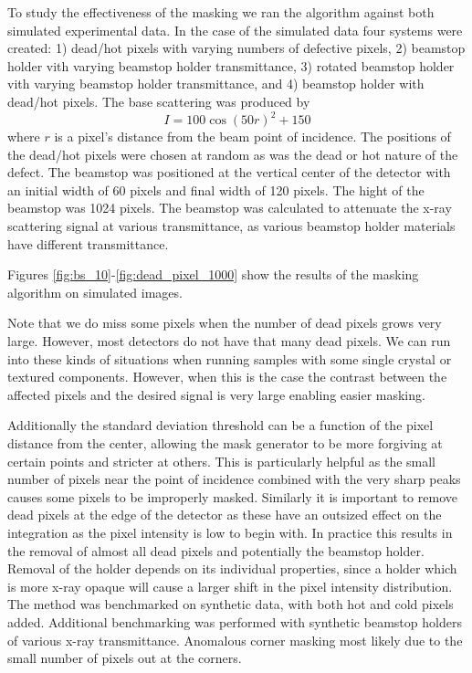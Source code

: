 To study the effectiveness of the masking we ran the algorithm against both simulated experimental data.
In the case of the simulated data four systems were created:
1) dead/hot pixels with varying numbers of defective pixels,
2) beamstop holder vith varying beamstop holder transmittance,
3) rotated beamstop holder vith varying beamstop holder transmittance,
and 4) beamstop holder with dead/hot pixels.
The base scattering was produced by
\begin{equation}
I = 100\cos(50r)^{2} + 150
\end{equation}
where $r$ is a pixel's distance from the beam point of incidence.
The positions of the dead/hot pixels were chosen at random as was the dead or hot nature of the defect.
The beamstop was positioned at the vertical center of the detector with an initial width of 60 pixels and final width of 120 pixels.
The hight of the beamstop was 1024 pixels.
The beamstop was calculated to attenuate the x-ray scattering signal at various transmittance, as various beamstop holder materials have different transmittance.



Figures \ref{fig:bs_10}-\ref{fig:dead_pixel_1000} show the results of the masking algorithm on simulated images.





Note that we do miss some pixels when the number of dead pixels grows very large.
However, most detectors do not have that many dead pixels.
We can run into these kinds of situations when running samples with some single crystal or textured components. 
However, when this is the case the contrast between the affected pixels and the desired signal is very large enabling easier masking.

Additionally the standard deviation threshold can be a function of the pixel distance from the center, allowing the mask generator to be more forgiving at certain points and stricter at others.
This is particularly helpful as the small number of pixels near the point of incidence combined with the very sharp peaks causes some pixels to be improperly masked.
Similarly it is important to remove dead pixels at the edge of the detector as these have an outsized effect on the integration as the pixel intensity is low to begin with.
In practice this results in the removal of almost all dead pixels and potentially the beamstop holder.
Removal of the holder depends on its individual properties, since a holder which is more x-ray opaque will cause a larger shift in the pixel intensity distribution.
The method was benchmarked on synthetic data, with both hot and cold pixels added.
Additional benchmarking was performed with synthetic beamstop holders of various x-ray transmittance.
Anomalous corner masking most likely due to the small number of pixels out at the corners.



